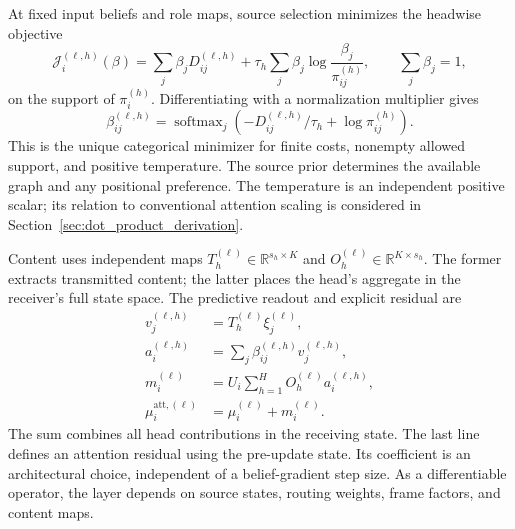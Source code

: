 \documentclass[twoside,11pt]{article}
\newcommand{\softmax}{\operatorname{softmax}}
\begin{document}
At fixed input beliefs and role maps, source selection minimizes the headwise objective
\begin{equation}
\mathcal J_i^{(\ell,h)}(\beta)
=\sum_j\beta_jD_{ij}^{(\ell,h)}
+\tau_h\sum_j\beta_j\log\frac{\beta_j}{\pi_{ij}^{(h)}},
\qquad \sum_j\beta_j=1,
\label{eq:relational_routing_objective}
\end{equation}
on the support of $\pi_i^{(h)}$. Differentiating with a normalization multiplier gives
\begin{equation}
\beta_{ij}^{(\ell,h)}
=\softmax_j\left(-D_{ij}^{(\ell,h)}/\tau_h+\log\pi_{ij}^{(h)}\right).
\label{eq:relational_routing}
\end{equation}
This is the unique categorical minimizer for finite costs, nonempty allowed support, and positive temperature. The source prior determines the available graph and any positional preference. The temperature is an independent positive scalar; its relation to conventional attention scaling is considered in Section~\ref{sec:dot_product_derivation}.

Content uses independent maps $T_h^{(\ell)}\in\mathbb R^{s_h\times K}$ and $O_h^{(\ell)}\in\mathbb R^{K\times s_h}$. The former extracts transmitted content; the latter places the head's aggregate in the receiver's full state space. The predictive readout and explicit residual are
\begin{align}
v_j^{(\ell,h)}&=T_h^{(\ell)}\xi_j^{(\ell)},\\
a_i^{(\ell,h)}&=\sum_j\beta_{ij}^{(\ell,h)}v_j^{(\ell,h)},\\
m_i^{(\ell)}&=U_i\sum_{h=1}^{H}O_h^{(\ell)}a_i^{(\ell,h)},\\
\mu_i^{\mathrm{att},(\ell)}&=\mu_i^{(\ell)}+m_i^{(\ell)}.
\label{eq:relational_predictive_residual}
\end{align}
The sum combines all head contributions in the receiving state. The last line defines an attention residual using the pre-update state. Its coefficient is an architectural choice, independent of a belief-gradient step size. As a differentiable operator, the layer depends on source states, routing weights, frame factors, and content maps.
\end{document}

